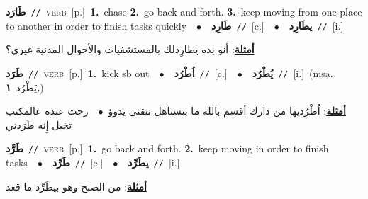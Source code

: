 \documentclass[10pt,a4paper,twoside]{article} %
\begin{document}
\begin{multicols}{2}
{\setlength\topsep{0pt}\textbf{\foreignlanguage{arabic}{طَارَد}}\ {\color{gray}\texttt{//}\color{black}}\ \textsc{verb}\ [p.]\ \textbf{1.}~chase  \textbf{2.}~go back and forth.  \textbf{3.}~keep moving from one place to another in order to finish tasks quickly\ \ $\bullet$\ \ \setlength\topsep{0pt}\textbf{\foreignlanguage{arabic}{طَارِد}}\ {\color{gray}\texttt{//}\color{black}}\ [c.]\ \ $\bullet$\ \ \setlength\topsep{0pt}\textbf{\foreignlanguage{arabic}{يطَارِد}}\ {\color{gray}\texttt{//}\color{black}}\ [i.]\  \begin{flushright}\color{gray}\foreignlanguage{arabic}{\textbf{\underline{\foreignlanguage{arabic}{أمثلة}}}: أنو بده يطارِدلك بالمستشفيات والأحوال المدنية غيري؟}\end{flushright}\color{black}} \vspace{2mm}

{\setlength\topsep{0pt}\textbf{\foreignlanguage{arabic}{طَرَد}}\ {\color{gray}\texttt{//}\color{black}}\ \textsc{verb}\ [p.]\ \textbf{1.}~kick sb out\ \ $\bullet$\ \ \setlength\topsep{0pt}\textbf{\foreignlanguage{arabic}{اُطْرُد}}\ {\color{gray}\texttt{//}\color{black}}\ [c.]\ \ $\bullet$\ \ \setlength\topsep{0pt}\textbf{\foreignlanguage{arabic}{يُطْرُد}}\ {\color{gray}\texttt{//}\color{black}}\ [i.]\ \color{gray}(msa. \foreignlanguage{arabic}{يَطْرُد}~\foreignlanguage{arabic}{\textbf{١.}})\color{black}\  \begin{flushright}\color{gray}\foreignlanguage{arabic}{\textbf{\underline{\foreignlanguage{arabic}{أمثلة}}}: اُطْرُديها من دارك أقسم بالله ما بتستاهل تنقنى يدوؤ\ $\bullet$\ \  رحت عنده عالمكتب تخيل إِنه طَرَدني}\end{flushright}\color{black}} \vspace{2mm}

{\setlength\topsep{0pt}\textbf{\foreignlanguage{arabic}{طَرَّد}}\ {\color{gray}\texttt{//}\color{black}}\ \textsc{verb}\ [p.]\ \textbf{1.}~go back and forth.  \textbf{2.}~keep moving in order to finish tasks\ \ $\bullet$\ \ \setlength\topsep{0pt}\textbf{\foreignlanguage{arabic}{طَرِّد}}\ {\color{gray}\texttt{//}\color{black}}\ [c.]\ \ $\bullet$\ \ \setlength\topsep{0pt}\textbf{\foreignlanguage{arabic}{يطَرِّد}}\ {\color{gray}\texttt{//}\color{black}}\ [i.]\  \begin{flushright}\color{gray}\foreignlanguage{arabic}{\textbf{\underline{\foreignlanguage{arabic}{أمثلة}}}: من الصبح وهو بيطَرِّد ما قعد}\end{flushright}\color{black}} \vspace{2mm}


\end{multicols}
\end{document}
